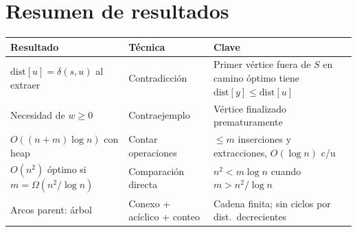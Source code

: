 \documentclass[11pt, letterpaper]{article}
\theoremstyle{definition}
\theoremstyle{plain}
\theoremstyle{remark}
\begin{document}
\section{Resumen de resultados}

\begin{table}[h]
\centering
\begin{tabular}{llp{5.5cm}}
\toprule
\textbf{Resultado} & \textbf{Técnica} & \textbf{Clave} \\
\midrule
$\mathrm{dist}[u] = \delta(s,u)$ al extraer
  & Contradicción
  & Primer vértice fuera de $S$ en camino óptimo tiene
    $\mathrm{dist}[y] \leq \mathrm{dist}[u]$ \\
Necesidad de $w \geq 0$
  & Contraejemplo
  & Vértice finalizado prematuramente \\
$O((n{+}m)\log n)$ con heap
  & Contar operaciones
  & $\leq m$ inserciones y extracciones, $O(\log n)$ c/u \\
$O(n^2)$ óptimo si $m = \Omega(n^2/\log n)$
  & Comparación directa
  & $n^2 < m\log n$ cuando $m > n^2/\log n$ \\
Arcos parent: árbol
  & Conexo + acíclico + conteo
  & Cadena finita; sin ciclos por dist.\ decrecientes \\
\bottomrule
\end{tabular}
\end{table}
\end{document}
